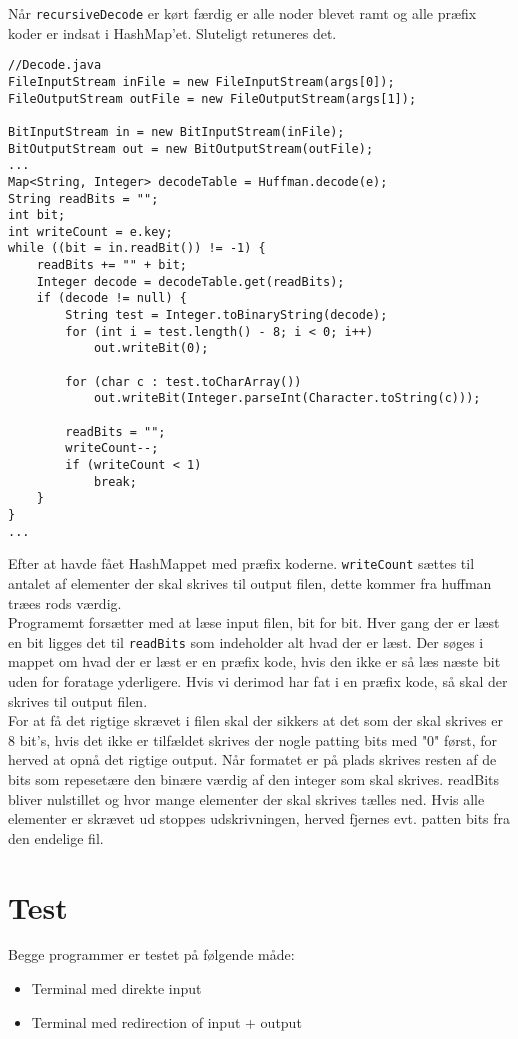\documentclass{article}
\begin{document}
Når \texttt{recursiveDecode} er kørt færdig er alle noder blevet ramt og alle præfix koder er indsat i HashMap'et. Sluteligt retuneres det.
\newpage
\begin{lstlisting}
//Decode.java
FileInputStream inFile = new FileInputStream(args[0]);
FileOutputStream outFile = new FileOutputStream(args[1]);

BitInputStream in = new BitInputStream(inFile);
BitOutputStream out = new BitOutputStream(outFile);
...
Map<String, Integer> decodeTable = Huffman.decode(e);
String readBits = "";
int bit;
int writeCount = e.key;
while ((bit = in.readBit()) != -1) {
	readBits += "" + bit;
	Integer decode = decodeTable.get(readBits);
	if (decode != null) {
		String test = Integer.toBinaryString(decode);
		for (int i = test.length() - 8; i < 0; i++) 
 			out.writeBit(0);	
 			
		for (char c : test.toCharArray())
			out.writeBit(Integer.parseInt(Character.toString(c)));

		readBits = "";
		writeCount--;
		if (writeCount < 1) 
			break;
	}
}
...
\end{lstlisting}
Efter at havde fået HashMappet med præfix koderne. \texttt{writeCount}  sættes til antalet af elementer der skal skrives til output filen, dette kommer fra huffman træes rods værdig.\\
Programemt forsætter med at læse input filen, bit for bit. Hver gang der er læst en bit ligges det til \texttt{readBits} som indeholder alt hvad der er læst.
Der søges i mappet om hvad der er læst er en præfix kode, hvis den ikke er så læs næste bit uden for foratage yderligere. Hvis vi derimod har fat i en præfix kode, så skal der skrives til output filen. \\
For at få det rigtige skrævet i filen skal der sikkers at det som der skal skrives er 8 bit's, hvis det ikke er tilfældet skrives der nogle patting bits med "0" først, for herved at opnå det rigtige output. Når formatet er på plads skrives resten af de bits som repesetære den binære værdig af den integer som skal skrives. readBits bliver nulstillet og hvor mange elementer der skal skrives tælles ned. Hvis alle elementer er skrævet ud stoppes udskrivningen, herved fjernes evt. patten bits fra den endelige fil.
\newpage
\section*{Test}
Begge programmer er testet på følgende måde:
\begin{itemize}
  \item Terminal med direkte input
  \item Terminal med redirection of input + output
\end{itemize}
\bigskip
\end{document}
